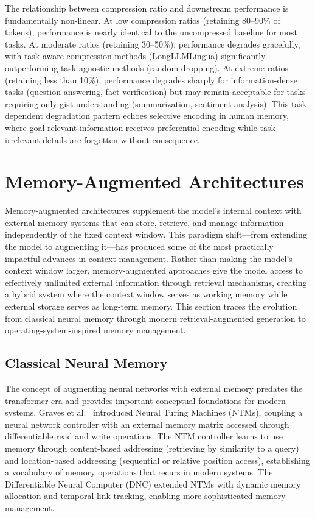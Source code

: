 \documentclass[11pt,letterpaper]{article}
\begin{document}
The relationship between compression ratio and downstream performance is fundamentally non-linear. At low compression ratios (retaining 80--90\% of tokens), performance is nearly identical to the uncompressed baseline for most tasks. At moderate ratios (retaining 30--50\%), performance degrades gracefully, with task-aware compression methods (LongLLMLingua) significantly outperforming task-agnostic methods (random dropping). At extreme ratios (retaining less than 10\%), performance degrades sharply for information-dense tasks (question answering, fact verification) but may remain acceptable for tasks requiring only gist understanding (summarization, sentiment analysis). This task-dependent degradation pattern echoes selective encoding in human memory, where goal-relevant information receives preferential encoding while task-irrelevant details are forgotten without consequence.


\section{Memory-Augmented Architectures}
\label{sec:memory}

Memory-augmented architectures supplement the model's internal context with external memory systems that can store, retrieve, and manage information independently of the fixed context window. This paradigm shift---from extending the model to augmenting it---has produced some of the most practically impactful advances in context management. Rather than making the model's context window larger, memory-augmented approaches give the model access to effectively unlimited external information through retrieval mechanisms, creating a hybrid system where the context window serves as working memory while external storage serves as long-term memory. This section traces the evolution from classical neural memory through modern retrieval-augmented generation to operating-system-inspired memory management.

\subsection{Classical Neural Memory}

The concept of augmenting neural networks with external memory predates the transformer era and provides important conceptual foundations for modern systems. Graves et al.\ \cite{graves2014neural} introduced Neural Turing Machines (NTMs), coupling a neural network controller with an external memory matrix accessed through differentiable read and write operations. The NTM controller learns to use memory through content-based addressing (retrieving by similarity to a query) and location-based addressing (sequential or relative position access), establishing a vocabulary of memory operations that recurs in modern systems. The Differentiable Neural Computer (DNC) extended NTMs with dynamic memory allocation and temporal link tracking, enabling more sophisticated memory management.
\end{document}
